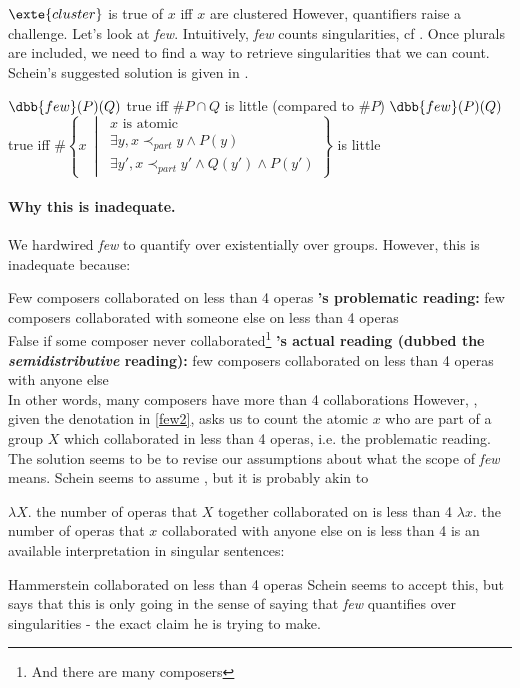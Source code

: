 \documentclass[english]{article}
\begin{document}
\ex
$\exte{cluster}$ is true of $x$ iff $x$ are clustered
\xe
%
However, quantifiers raise a challenge. Let's look at \emph{few}. Intuitively, \emph{few} counts singularities, cf . Once plurals are included, we need to find a way to retrieve singularities that we can count. Schein's suggested solution is given in .

\pex
\a $\dbb{few}(P)(Q)$ true iff $\#P\cap Q$ is little (compared to $\#P$)
\a $\dbb{few}(P)(Q)$ true iff $\#\left\lbrace x\ \middle|\ 
\begin{array}{l}
x\text{ is atomic}\\
\exists y, x\prec_{part} y \wedge P(y)\\
\exists y', x\prec_{part} y' \wedge Q(y') \wedge P(y')
\end{array}
\right\rbrace$ is little \label{few2}
\xe
%

\paragraph{Why this is inadequate.} We hardwired \emph{few} to quantify over existentially over groups. However, this is inadequate because:

\pex
\a Few composers collaborated on less than 4 operas
\a \textbf{'s problematic reading:} few  composers collaborated with someone else on less than 4 operas\\
False if some composer never collaborated\footnote{And there are many composers}
\a \textbf{\cnextx{a}'s actual reading (dubbed the \emph{semidistributive} reading):} few composers collaborated on less than 4 operas with anyone else\\ 
In other words, many composers have more than 4 collaborations
\xe
%
However, , given the denotation in \cref{few2}, asks us to count the atomic $x$ who are part of a group $X$ which collaborated in less than 4 operas, i.e. the problematic reading. The solution seems to be to revise our assumptions about what the scope of \emph{few} means. Schein seems to assume , but it is probably akin to 

\pex
\a $\lambda X.$ the number of operas that $X$ together collaborated on is less than 4
\a $\lambda x.$ the number of operas that $x$ collaborated with anyone else on is less than 4
\xe
%
 is an available interpretation in singular sentences:

\ex
Hammerstein collaborated on less than 4 operas
\xe
%
Schein seems to accept this, but says that this is only going in the sense of saying that \emph{few} quantifies over singularities - the exact claim he is trying to make.
\end{document}
